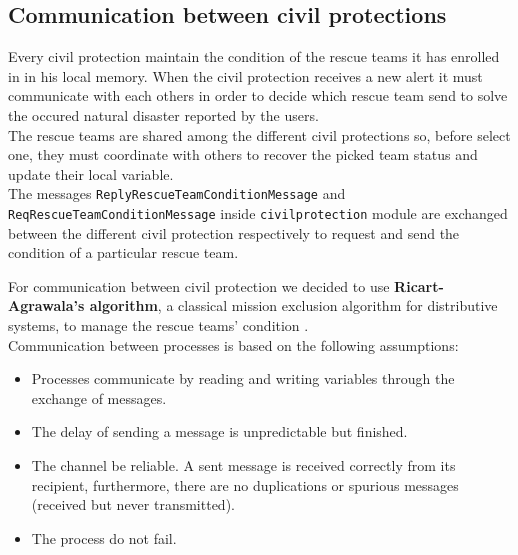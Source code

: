 \documentclass[a4paper,12pt]{report}
\begin{document}
\subsection{Communication between civil protections}
Every civil protection maintain the condition of the rescue teams it has enrolled in in his local memory. 
When the civil protection receives a new alert it must communicate with each others in order to decide which rescue team send to solve the occured natural disaster reported by the users.\\
The rescue teams are shared among the different civil protections so, before select one, they must coordinate with others to recover the picked team status and update their local variable.\\
The messages \texttt{ReplyRescueTeamConditionMessage} and\\ \texttt{ReqRescueTeamConditionMessage} inside \texttt{civilprotection} module are exchanged between the different civil protection respectively to request and send the condition of a particular rescue team.

For communication between civil protection we decided to use \textbf{ Ricart-Agrawala's algorithm}, a classical mission exclusion algorithm for distributive systems, to manage the rescue teams' condition .\\
Communication between processes is based on the following assumptions:
\begin{itemize}
\item Processes communicate by reading and writing variables through the exchange of messages.
\item The delay of sending a message is unpredictable but finished.
\item The channel be reliable. A sent message is received correctly from its recipient, furthermore, there are no duplications or spurious messages (received but never transmitted). 
\item The process do not fail. 
\end{itemize}
\end{document}
